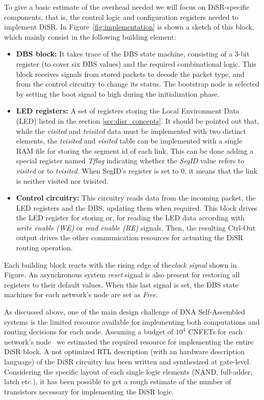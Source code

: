 To give a basic estimate of the overhead needed we will focus on
DiSR-specific components, that is, the control logic and configuration
registers needed to implement DiSR. In
Figure~\ref{fig:implementation} is shown a sketch of this block, which
mainly consist in the following building element: 
\begin{itemize}
	\item \textbf{DBS block:} It takes trace of the DBS state machine, 
	consisting of a 3-bit register (to cover six DBS values) and the 
	required combinational logic. This block receives signals from 
	stored packets to decode the packet type, and from 
	the control circuitry to change its status.
	The bootstrap node is selected by setting the boot signal to high
	during the initialization phase.  
	\item \textbf{LED registers:} A set of registers storing 
	the Local Environment Data (LED) listed in the section
	\ref{sec:disr_concepts}. It should be pointed out that, while the \emph{visited} 
	and \emph{tvisited} data must be implemented with two distinct
	elements, the \emph{tvisited} and \emph{visited} table can be implemented with 
	a single RAM file for storing the segment id of each link.
	This can be done adding a special register named \emph{Tflag}
	indicating whether the \emph{SegID} value refers to \emph{visited} or to 
	\emph{tvisited}. When SegID's register is set to 0, it means that the link
	is neither visited nor tvisited.

    \item \textbf{Control circuitry:} This circuitry reads data from
	the incoming packet, the LED registers and the DBS,
	updating them when required. This block drives the LED register 
	for storing or, for reading the LED data according with
	\emph{write enable (WE)} or \emph{read enable (RE)}
	signals. Then, the resulting Ctrl-Out output drives the other
	communication resources for actuating the DiSR routing operation.
\end{itemize}

Each building block reacts with the rising edge  of
the\emph{clock signal} shown in Figure. An asynchronous system
\emph{reset} signal is also present for restoring all registers to
their default values. When this last signal is
set, the DBS state machines for each network's node are set as
\emph{Free}. 

As discussed above, one of the main design challenge of DNA
Self-Assembled systems is the limited resource available for
implementing both computations and routing decisions for each node.
Assuming a budget of $10^4$ CNFETs for each network's
node~\cite{liu_jetcs}  we estimated the required resource for
implementing the entire DiSR block.  A not optimized RTL description
(with an hardware description language)  of the DiSR circuitry has
been written and synthesized at gate-level. Considering the specific
layout of each single logic elements (NAND, full-adder, latch etc.),
it has been possible to get a rough estimate of the number of
transistors necessary for implementing the DiSR logic.


